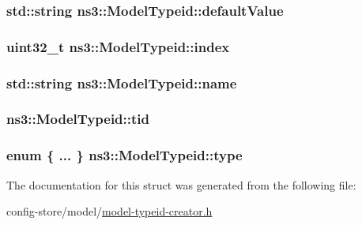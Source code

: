 \subsubsection[{\texorpdfstring{default\+Value}{defaultValue}}]{\setlength{\rightskip}{0pt plus 5cm}std\+::string ns3\+::\+Model\+Typeid\+::default\+Value}\hypertarget{structns3_1_1ModelTypeid_aab55450e449461d95e145179eba2715b}{}\label{structns3_1_1ModelTypeid_aab55450e449461d95e145179eba2715b}
\subsubsection[{\texorpdfstring{index}{index}}]{\setlength{\rightskip}{0pt plus 5cm}uint32\+\_\+t ns3\+::\+Model\+Typeid\+::index}\hypertarget{structns3_1_1ModelTypeid_a0e95da0e21c60b28dcaaf1744abfb618}{}\label{structns3_1_1ModelTypeid_a0e95da0e21c60b28dcaaf1744abfb618}
\subsubsection[{\texorpdfstring{name}{name}}]{\setlength{\rightskip}{0pt plus 5cm}std\+::string ns3\+::\+Model\+Typeid\+::name}\hypertarget{structns3_1_1ModelTypeid_af1e4deab2ad1fd1688e9e561f92f02b2}{}\label{structns3_1_1ModelTypeid_af1e4deab2ad1fd1688e9e561f92f02b2}
\subsubsection[{\texorpdfstring{tid}{tid}}]{ ns3\+::\+Model\+Typeid\+::tid}\hypertarget{structns3_1_1ModelTypeid_a14c5f367bb4ad7b9cd91b497296b5d82}{}\label{structns3_1_1ModelTypeid_a14c5f367bb4ad7b9cd91b497296b5d82}
\subsubsection[{\texorpdfstring{type}{type}}]{\setlength{\rightskip}{0pt plus 5cm}enum \{ ... \}   ns3\+::\+Model\+Typeid\+::type}\hypertarget{structns3_1_1ModelTypeid_adee7e974876ae40c73f6a7faa509aa09}{}\label{structns3_1_1ModelTypeid_adee7e974876ae40c73f6a7faa509aa09}


The documentation for this struct was generated from the following file\+:\begin{DoxyCompactItemize}
\item 
config-\/store/model/\hyperlink{model-typeid-creator_8h}{model-\/typeid-\/creator.\+h}\end{DoxyCompactItemize}
